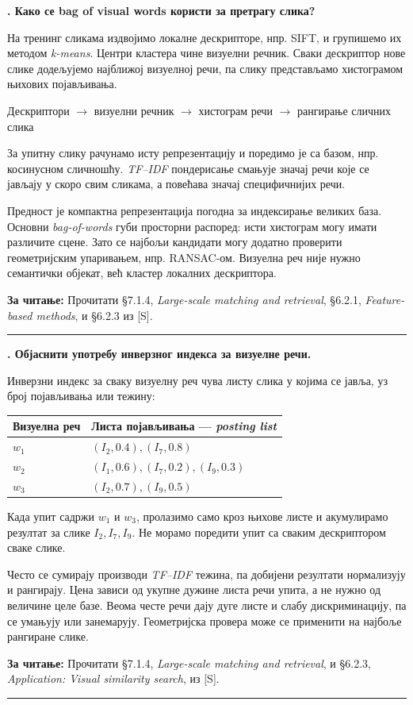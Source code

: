 \documentclass[10pt,a4paper]{article}
\newcommand{\en}[1]{\textit{#1}}
\newcounter{pitanje}
\newenvironment{odgovor}[1]{\stepcounter{pitanje}\begin{minipage}[t][0.455\textheight][t]{\textwidth}\vspace{0pt}\textbf{\thepitanje. #1}\par\smallskip}{\end{minipage}\par\ifodd\value{pitanje}\vspace{0.025\textheight}\hrule\vspace{0.015\textheight}\else\newpage\fi}
\newcommand{\izvor}[1]{\par\vfill{\footnotesize\textbf{За читање:} #1}\par}
\newcommand{\lanac}[1]{\begin{center}\small #1\end{center}}
\begin{document}
\begin{odgovor}{Како се bag of visual words користи за претрагу слика?}
На тренинг сликама издвојимо локалне дескрипторе, нпр. SIFT, и групишемо их методом \en{k-means}. Центри кластера чине визуелни речник. Сваки дескриптор нове слике додељујемо најближој визуелној речи, па слику представљамо хистограмом њихових појављивања.
\lanac{Дескриптори $\to$ визуелни речник $\to$ хистограм речи $\to$ рангирање сличних слика}
За упитну слику рачунамо исту репрезентацију и поредимо је са базом, нпр. косинусном сличношћу. \en{TF--IDF} пондерисање смањује значај речи које се јављају у скоро свим сликама, а повећава значај специфичнијих речи.

Предност је компактна репрезентација погодна за индексирање великих база. Основни \en{bag-of-words} губи просторни распоред: исти хистограм могу имати различите сцене. Зато се најбољи кандидати могу додатно проверити геометријским упаривањем, нпр. RANSAC-ом. Визуелна реч није нужно семантички објекат, већ кластер локалних дескриптора.
\izvor{Прочитати §7.1.4, \en{Large-scale matching and retrieval}, §6.2.1, \en{Feature-based methods}, и §6.2.3 из [S].}
\end{odgovor}

\begin{odgovor}{Објаснити употребу инверзног индекса за визуелне речи.}
Инверзни индекс за сваку визуелну реч чува листу слика у којима се јавља, уз број појављивања или тежину:
\begin{center}\begin{tabular}{ll}\toprule
Визуелна реч & Листа појављивања — \en{posting list}\\\midrule
$w_1$ & $(I_2,0.4), (I_7,0.8)$\\
$w_2$ & $(I_1,0.6), (I_7,0.2), (I_9,0.3)$\\
$w_3$ & $(I_2,0.7), (I_9,0.5)$\\\bottomrule
\end{tabular}\end{center}
Када упит садржи $w_1$ и $w_3$, пролазимо само кроз њихове листе и акумулирамо резултат за слике $I_2,I_7,I_9$. Не морамо поредити упит са сваким дескриптором сваке слике.

Често се сумирају производи \en{TF--IDF} тежина, па добијени резултати нормализују и рангирају. Цена зависи од укупне дужине листа речи упита, а не нужно од величине целе базе. Веома честе речи дају дуге листе и слабу дискриминацију, па се умањују или занемарују. Геометријска провера може се применити на најбоље рангиране слике.
\izvor{Прочитати §7.1.4, \en{Large-scale matching and retrieval}, и §6.2.3, \en{Application: Visual similarity search}, из [S].}
\end{odgovor}
\end{document}
